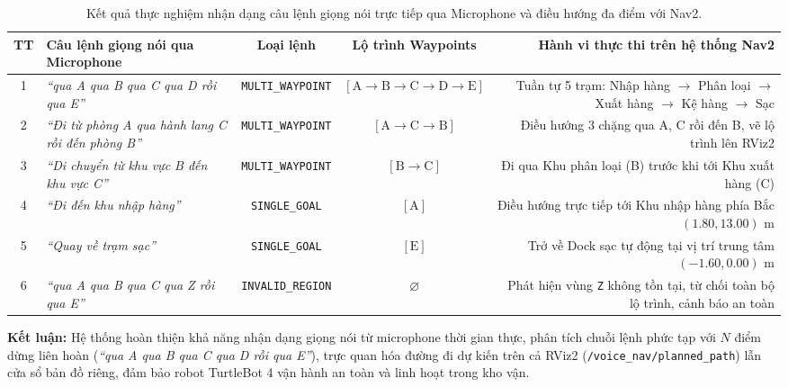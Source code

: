 \documentclass[10pt,a4paper]{article}
\begin{document}
\begin{table}[H]
  \centering
  \scriptsize
  \caption{\footnotesize Kết quả thực nghiệm nhận dạng câu lệnh giọng nói trực tiếp qua Microphone và điều hướng đa điểm với Nav2.}
  \vspace{-3pt}
  \renewcommand{\arraystretch}{1.06}
  \begin{tabularx}{\textwidth}{c p{4.2cm} c c R}
    \toprule
    \textbf{TT} & \textbf{Câu lệnh giọng nói qua Microphone} & \textbf{Loại lệnh} & \textbf{Lộ trình Waypoints} & \textbf{Hành vi thực thi trên hệ thống Nav2} \\
     & \textit{``qua A qua B qua C qua D rồi qua E''} & \texttt{MULTI\_WAYPOINT} & $[\text{A} \rightarrow \text{B} \rightarrow \text{C} \rightarrow \text{D} \rightarrow \text{E}]$ & Tuần tự 5 trạm: Nhập hàng $\rightarrow$ Phân loại $\rightarrow$ Xuất hàng $\rightarrow$ Kệ hàng $\rightarrow$ Sạc \\
    2 & \textit{``Đi từ phòng A qua hành lang C rồi đến phòng B''} & \texttt{MULTI\_WAYPOINT} & $[\text{A} \rightarrow \text{C} \rightarrow \text{B}]$ & Điều hướng 3 chặng qua A, C rồi đến B, vẽ lộ trình lên RViz2 \\
    3 & \textit{``Di chuyển từ khu vực B đến khu vực C''} & \texttt{MULTI\_WAYPOINT} & $[\text{B} \rightarrow \text{C}]$ & Đi qua Khu phân loại (B) trước khi tới Khu xuất hàng (C) \\
    4 & \textit{``Đi đến khu nhập hàng''} & \texttt{SINGLE\_GOAL} & $[\text{A}]$ & Điều hướng trực tiếp tới Khu nhập hàng phía Bắc $(1.80, 13.00)\text{ m}$ \\
    5 & \textit{``Quay về trạm sạc''} & \texttt{SINGLE\_GOAL} & $[\text{E}]$ & Trở về Dock sạc tự động tại vị trí trung tâm $(-1.60, 0.00)\text{ m}$ \\
    6 & \textit{``qua A qua B qua C qua Z rồi qua E''} & \texttt{INVALID\_REGION} & $\varnothing$ & Phát hiện vùng \texttt{Z} không tồn tại, từ chối toàn bộ lộ trình, cảnh báo an toàn \\
    \bottomrule
  \end{tabularx}
\end{table}
\vspace{-2pt}

\textbf{Kết luận:} Hệ thống hoàn thiện khả năng nhận dạng giọng nói từ microphone thời gian thực, phân tích chuỗi lệnh phức tạp với $N$ điểm dừng liên hoàn (\textit{``qua A qua B qua C qua D rồi qua E''}), trực quan hóa đường đi dự kiến trên cả RViz2 (\texttt{/voice\_nav/planned\_path}) lẫn cửa sổ bản đồ riêng, đảm bảo robot TurtleBot 4 vận hành an toàn và linh hoạt trong kho vận.
\end{document}
